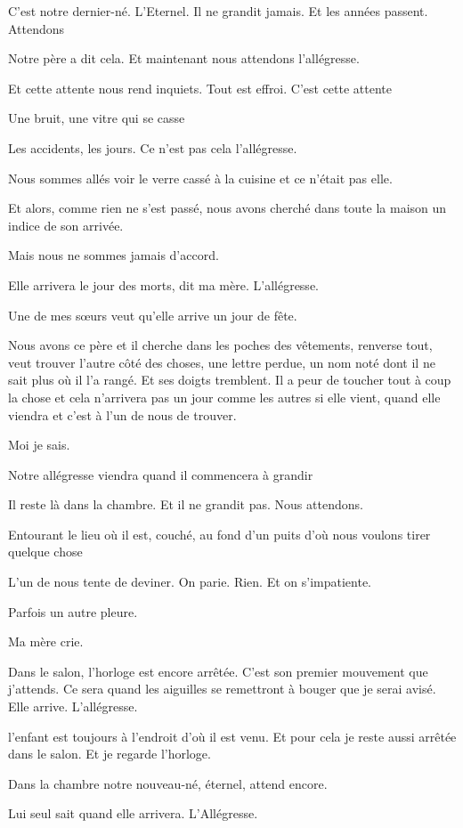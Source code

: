 C'est notre dernier-né. L'Eternel. Il ne grandit jamais. Et les années
passent. Attendons

Notre père a dit cela. Et maintenant nous attendons l'allégresse.

Et cette attente nous rend inquiets. Tout est effroi. C'est cette
attente

Une bruit, une vitre qui se casse

Les accidents, les jours. Ce n'est pas cela l'allégresse.

Nous sommes allés voir le verre cassé à la cuisine et ce n'était pas
elle.

Et alors, comme rien ne s'est passé, nous avons cherché dans toute la
maison un indice de son arrivée.

Mais nous ne sommes jamais d'accord.

Elle arrivera le jour des morts, dit ma mère. L'allégresse.

Une de mes sœurs veut qu'elle arrive un jour de fête.

Nous avons ce père et il cherche dans les poches des vêtements, renverse
tout, veut trouver l'autre côté des choses, une lettre perdue, un nom
noté dont il ne sait plus où il l'a rangé. Et ses doigts tremblent. Il a
peur de toucher tout à coup la chose et cela n'arrivera pas un jour
comme les autres si elle vient, quand elle viendra et c'est à l'un de
nous de trouver.

Moi je sais.

Notre allégresse viendra quand il commencera à grandir

Il reste là dans la chambre. Et il ne grandit pas. Nous attendons.

Entourant le lieu où il est, couché, au fond d'un puits d'où nous
voulons tirer quelque chose

L'un de nous tente de deviner. On parie. Rien. Et on s'impatiente.

Parfois un autre pleure.

Ma mère crie.

Dans le salon, l'horloge est encore arrêtée. C'est son premier mouvement
que j'attends. Ce sera quand les aiguilles se remettront à bouger que je
serai avisé. Elle arrive. L'allégresse.

l'enfant est toujours à l'endroit d'où il est venu. Et pour cela je
reste aussi arrêtée dans le salon. Et je regarde l'horloge.

Dans la chambre notre nouveau-né, éternel, attend encore.

Lui seul sait quand elle arrivera. L'Allégresse.

